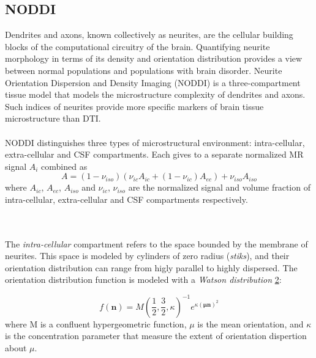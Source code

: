  \subsection{NODDI}
 Dendrites and axons, known collectively as neurites, are the cellular building blocks of the computational circuitry of the brain. Quantifying neurite morphology in terms of its density and orientation distribution provides a view between normal populations and populations with brain disorder. \cite{zhang2012noddi}
 Neurite Orientation Dispersion and Density Imaging (NODDI) is a three-compartment tissue model that models the microstructure complexity of dendrites and axons. Such indices of neurites provide more specific markers of brain tissue microstructure than DTI. \cite{zhang2012noddi}
 \\\\
 NODDI distinguishes three types of microstructural environment: intra-cellular, extra-cellular and CSF compartments. Each gives to a separate normalized MR signal $A_i$ combined as
 \begin{equation}
   A=(1-\nu_{iso})(\nu_{ic}A_{ic}+(1-\nu_{ic})A_{ec})+\nu_{iso}A_{iso}
 \end{equation}
 where $A_{ic}$, $A_{ec}$, $A_{iso}$ and $\nu_{ic}$, $\nu_{iso}$ are the normalized signal and volume fraction of intra-cellular, extra-cellular and CSF compartments respectively.
 \begin{figure}[h]
   \centering
   \caption{}
   \label{fig:compartments}
 \end{figure}
 \\\\
 The \emph{intra-cellular} compartment refers to the space bounded by the membrane of neurites. This space is modeled by cylinders of zero radius (\emph{stiks}), and their orientation distribution can range from higly parallel to highly dispersed. The orientation distribution function is modeled with a \emph{Watson distribution} \ref{fig:watson_distribution}:
 \begin{figure}[h]
     \centering
     \caption{}
     \label{fig:watson_distribution}
 \end{figure}
 \begin{equation}
   f(\mathbf{n}) = M(\frac{1}{2},\frac{3}{2},\kappa)^{-1}e^{\kappa(\mathbf{ \mu n})^2}
 \end{equation}
 where M is a confluent hypergeometric function, $\mu$ is the mean orientation, and $\kappa$ is the concentration parameter that measure the extent of orientation dispertion about $\mu$.
